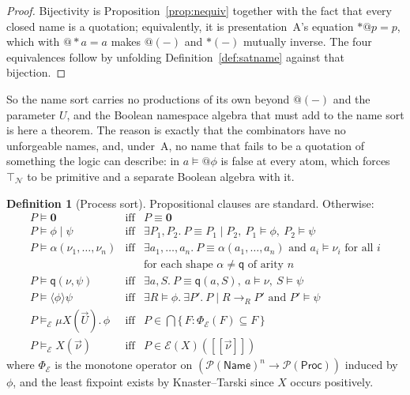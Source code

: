 \documentclass[11pt]{article}
\makeatletter
\theoremstyle{plain}
\theoremstyle{definition}
\newtheorem{definition}[theorem]{Definition}
\theoremstyle{remark}
\newcommand{\quo}[1]{@#1}
\newcommand{\drp}[1]{{*}#1}
\newcommand{\nil}{\mathbf{0}}
\newcommand{\qq}{\mathsf{q}}
\newcommand{\red}{\longrightarrow}
\newcommand{\scong}{\equiv}
\newcommand{\env}{\mathcal{E}}
\newcommand{\may}[1]{\langle #1 \rangle}
\newcommand{\sat}{\models}
\newcommand{\fix}{\mu}
\newcommand{\sem}[1]{[\![#1]\!]}
\makeatother
\begin{document}
\begin{proof}
Bijectivity is Proposition~\ref{prop:nequiv} together with the fact that every
closed name is a quotation; equivalently, it is presentation~A's equation
$\drp{\quo{p}} = p$, which with $\quo{\drp{a}} = a$ makes $\quo{(-)}$ and
$\drp{(-)}$ mutually inverse. The four equivalences follow
by unfolding Definition~\ref{def:satname} against that bijection.
\end{proof}

So the name sort carries no productions of its own beyond $\quo{(-)}$ and the
parameter $U$, and the Boolean namespace algebra that \cite{f1r3space} must add
to the name sort is here a theorem. The reason is exactly that the combinators
have no unforgeable names, and, under~A, no name that fails to be a quotation
of something the logic can describe: in \cite{f1r3space} $a \sat \quo{\phi}$ is false at
every atom, which forces $\top_{\mathcal{N}}$ to be primitive and a separate
Boolean algebra with it.

\begin{definition}[Process sort]
\label{def:satproc}
Propositional clauses are standard. Otherwise:
\[
\begin{array}{lcl}
  P \sat \nil &\text{iff}& P \scong \nil\\[2pt]
  P \sat \phi \mid \psi &\text{iff}&
     \exists P_1,P_2.\ P \scong P_1 \mid P_2,\
     P_1 \sat \phi,\ P_2 \sat \psi\\[4pt]
  P \sat \alpha(\nu_1,\dots,\nu_n) &\text{iff}&
     \exists a_1,\dots,a_n.\ P \scong \alpha(a_1,\dots,a_n)
     \text{ and } a_i \sat \nu_i \text{ for all } i\\
  &&\text{for each shape } \alpha \neq \qq \text{ of arity } n\\[2pt]
  P \sat \qq(\nu,\psi) &\text{iff}&
     \exists a, S.\ P \scong \qq(a,S),\ a \sat \nu,\ S \sat \psi\\[4pt]
  P \sat \may{\phi}\psi &\text{iff}&
     \exists R \sat \phi.\ \exists P'.\
     P \mid R \red_{R} P' \text{ and } P' \sat \psi\\[4pt]
  P \sat_{\env} \fix X(\vec U).\,\phi
     &\text{iff}& P \in \bigcap \{\, F : \Phi_{\env}(F) \subseteq F \,\}\\
  P \sat_{\env} X(\vec\nu) &\text{iff}& P \in \env(X)(\sem{\vec\nu})
\end{array}
\]
where $\Phi_{\env}$ is the monotone operator on
$(\mathcal{P}(\mathsf{Name})^{n} \to \mathcal{P}(\mathsf{Proc}))$ induced by
$\phi$, and the least fixpoint exists by Knaster--Tarski since $X$ occurs
positively.
\end{definition}
\end{document}
